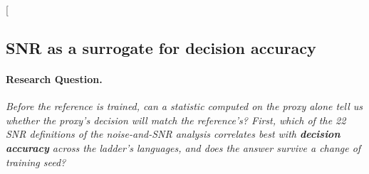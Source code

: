 \clearpage
\twocolumn[{%
\rqparent
\subsection{SNR as a surrogate for decision accuracy}
\label{app:rq04_surrogates}

\noindent\begin{minipage}[t]{0.485\textwidth}
\vspace{0pt}
\paragraph{Research Question.} \emph{Before the reference is trained, can a statistic computed on the proxy alone tell us whether the proxy's decision will match the reference's? First, which of the 22 SNR definitions of the noise-and-SNR analysis correlates best with \textbf{decision accuracy} across the ladder's languages, and does the answer survive a change of training seed?}


\end{minipage}}
